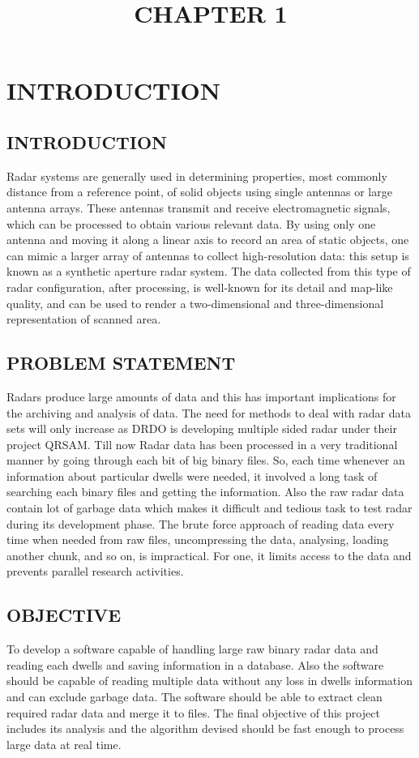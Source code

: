 \documentclass[14pt]{article} %
\begin{document}
\tableofcontents
\listoffigures
\pagebreak
\title{CHAPTER 1}
\maketitle
\section{INTRODUCTION}

\subsection{INTRODUCTION}
         Radar systems are generally used in determining properties, most commonly distance from a reference point, of solid objects using single antennas or large antenna arrays. These antennas transmit and receive electromagnetic signals, which can be processed to obtain various relevant data. By using only one antenna and moving it along a linear axis to record an area of static objects, one can mimic a larger array of antennas to collect high-resolution data: this setup is known as a synthetic aperture radar system. The data collected from this type of radar configuration, after processing, is well-known for its detail and map-like quality, and can be used to render a two-dimensional and three-dimensional representation of scanned area.

\subsection{PROBLEM STATEMENT}
           Radars produce large amounts of data and this has important implications for the archiving and analysis of data. The need for methods to deal with radar data sets will only increase as DRDO is developing multiple sided radar under their project QRSAM. Till now Radar data has been processed in a very traditional manner by going through each bit of big binary files. So, each time whenever an information about particular dwells were needed, it involved a long task of searching each binary files and getting the information. Also the raw radar data contain lot of garbage data which makes it difficult and tedious task to test radar during its development phase. The brute force approach of reading data every time when needed from raw files, uncompressing the data, analysing, loading another chunk, and so on, is impractical. For one, it limits access to the data and prevents parallel research activities.

\subsection{OBJECTIVE}
 To develop a software capable of handling large raw binary radar data and reading each dwells and saving information in a database. Also the software should be capable of reading multiple data without any loss in dwells information and can exclude garbage data. The software should be able to extract clean required radar data and merge it to files. The final objective of this project includes its analysis and the algorithm devised should be fast enough to process large data at real time. 
\end{document}
